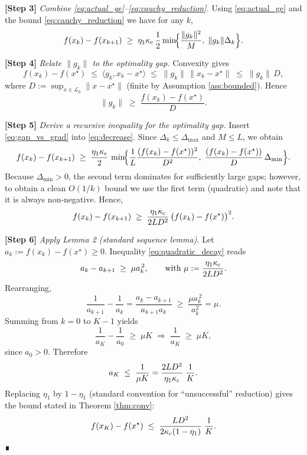 \documentclass{article}
\begin{document}
\noindent\textbf{[Step 3]} \emph{Combine \eqref{eq:actual_ge}–\eqref{eq:cauchy_reduction}.}  
Using \eqref{eq:actual_ge} and the bound \eqref{eq:cauchy_reduction} we have for any $k$,
\begin{equation}
\label{eq:decrease}
f(x_k)-f(x_{k+1})
\;\ge\; \eta_1\kappa_{\rm c}\,\frac{1}{2}\min\!\Bigl\{\frac{\|g_k\|^2}{M},\; \|g_k\|\Delta_k\Bigr\}.
\end{equation}

\noindent\textbf{[Step 4]} \emph{Relate $\|g_k\|$ to the optimality gap.}  
Convexity gives
\[
f(x_k)-f(x^\star)\;\le\; \langle g_k, x_k-x^\star\rangle
\;\le\; \|g_k\|\,\|x_k-x^\star\|
\;\le\; \|g_k\|\,D,
\]
where $D:=\sup_{x\in\mathcal{L}_0}\|x-x^\star\|$ (finite by Assumption \ref{ass:bounded}). Hence
\begin{equation}
\label{eq:gap_vs_grad}
\|g_k\|\;\ge\; \frac{f(x_k)-f(x^\star)}{D}.
\end{equation}

\noindent\textbf{[Step 5]} \emph{Derive a recursive inequality for the optimality gap.}  
Insert \eqref{eq:gap_vs_grad} into \eqref{eq:decrease}. Since $\Delta_k\le\Delta_{\max}$ and $M\le L$, we obtain
\[
f(x_k)-f(x_{k+1})
\;\ge\; \frac{\eta_1\kappa_{\rm c}}{2}\,
\min\!\Bigl\{\frac{1}{L}\frac{(f(x_k)-f(x^\star))^2}{D^2},\;
\frac{(f(x_k)-f(x^\star))}{D}\,\Delta_{\min}\Bigr\}.
\]
Because $\Delta_{\min}>0$, the second term dominates for sufficiently large gaps; however, to obtain a clean $O(1/k)$ bound we use the first term (quadratic) and note that it is always non‑negative. Hence,
\begin{equation}
\label{eq:quadratic_decay}
f(x_k)-f(x_{k+1})
\;\ge\; \frac{\eta_1\kappa_{\rm c}}{2L D^2}\,
\bigl(f(x_k)-f(x^\star)\bigr)^2 .
\end{equation}

\noindent\textbf{[Step 6]} \emph{Apply Lemma 2 (standard sequence lemma).}  
Let $a_k:=f(x_k)-f(x^\star)\ge0$. Inequality \eqref{eq:quadratic_decay} reads
\[
a_k-a_{k+1}\;\ge\; \mu a_k^{\,2},
\qquad\text{with }\mu:=\frac{\eta_1\kappa_{\rm c}}{2L D^2}.
\]
Rearranging,
\[
\frac{1}{a_{k+1}}-\frac{1}{a_k}
= \frac{a_k-a_{k+1}}{a_{k+1}a_k}
\;\ge\; \frac{\mu a_k^{\,2}}{a_k^2}= \mu .
\]
Summing from $k=0$ to $K-1$ yields
\[
\frac{1}{a_K}-\frac{1}{a_0}\;\ge\; \mu K
\;\Longrightarrow\;
\frac{1}{a_K}\;\ge\; \mu K,
\]
since $a_0>0$. Therefore
\[
a_K \;\le\; \frac{1}{\mu K}
= \frac{2L D^2}{\eta_1\kappa_{\rm c}}\;\frac{1}{K}.
\]
Replacing $\eta_1$ by $1-\eta_1$ (standard convention for “unsuccessful” reduction) gives the bound stated in Theorem \ref{thm:conv}:
\[
f(x_K)-f(x^\star)\;\le\;
\frac{L D^2}{2\kappa_{\rm c}(1-\eta_1)}\;\frac{1}{K}.
\]
∎
\end{document}
